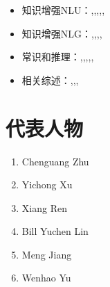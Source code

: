 \documentclass[12pt]{article}
\begin{document}
\begin{itemize}
    \item 知识增强NLU：\cite{zhang2019ernie},\cite{peters2019knowledge},\cite{liu2020k},\cite{ding2019cognitive},\cite{lv2020graph},\cite{yu2022jaket}
    \item 知识增强NLG：\cite{zhou2018commonsense},\cite{zhang2020grounded},\cite{ji2020language},\cite{lewis2020retrieval},\cite{wang2021retrieval}
    \item 常识和推理：\cite{ma2019towards},\cite{fan2020enhanced},\cite{liu2021kg},\cite{wang2021retrieval},\cite{guan2019story},\cite{guan2020knowledge}
    \item 相关综述：\cite{yu2020identifying},\cite{yang2021survey},\cite{zhang2022survey},\cite{wei2021knowledge}
\end{itemize}

\section{代表人物}

\begin{enumerate}
    \item Chenguang Zhu
    \item Yichong Xu
    \item Xiang Ren
    \item Bill Yuchen Lin
    \item Meng Jiang
    \item Wenhao Yu
\end{enumerate}



\end{document}
